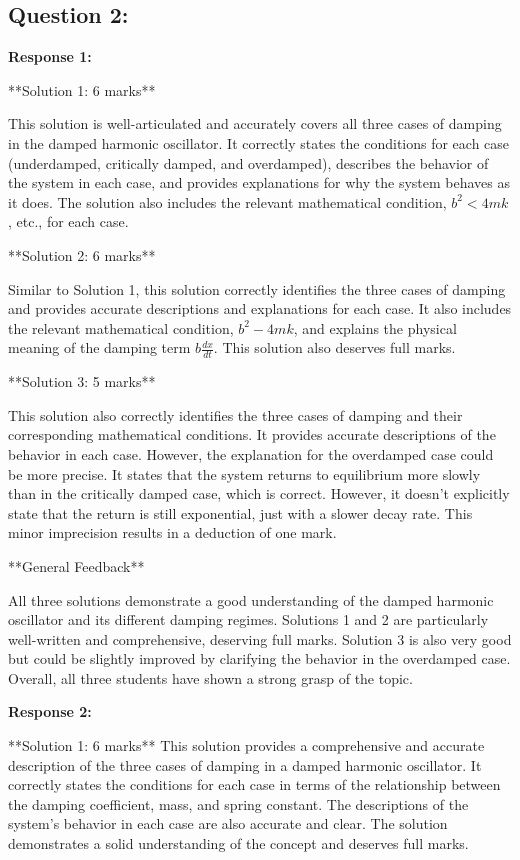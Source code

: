 \documentclass[a4paper,11pt]{article}
\begin{document}
\subsection*{Question 2:}

\textbf{Response 1:}

**Solution 1: 6 marks**

This solution is well-articulated and accurately covers all three cases of damping in the damped harmonic oscillator. It correctly states the conditions for each case (underdamped, critically damped, and overdamped), describes the behavior of the system in each case, and provides explanations for why the system behaves as it does. The solution also includes the relevant mathematical condition, \(b^2 < 4mk\), etc., for each case.

**Solution 2: 6 marks**

Similar to Solution 1, this solution correctly identifies the three cases of damping and provides accurate descriptions and explanations for each case. It also includes the relevant mathematical condition, \(b^2 - 4mk\), and explains the physical meaning of the damping term \(b\frac{dx}{dt}\). This solution also deserves full marks.

**Solution 3: 5 marks**

This solution also correctly identifies the three cases of damping and their corresponding mathematical conditions. It provides accurate descriptions of the behavior in each case. However, the explanation for the overdamped case could be more precise. It states that the system returns to equilibrium more slowly than in the critically damped case, which is correct. However, it doesn't explicitly state that the return is still exponential, just with a slower decay rate. This minor imprecision results in a deduction of one mark.

**General Feedback**

All three solutions demonstrate a good understanding of the damped harmonic oscillator and its different damping regimes. Solutions 1 and 2 are particularly well-written and comprehensive, deserving full marks. Solution 3 is also very good but could be slightly improved by clarifying the behavior in the overdamped case. Overall, all three students have shown a strong grasp of the topic.

\bigskip    
\textbf{Response 2:}

**Solution 1: 6 marks**
This solution provides a comprehensive and accurate description of the three cases of damping in a damped harmonic oscillator. It correctly states the conditions for each case in terms of the relationship between the damping coefficient, mass, and spring constant. The descriptions of the system's behavior in each case are also accurate and clear. The solution demonstrates a solid understanding of the concept and deserves full marks.
\end{document}
